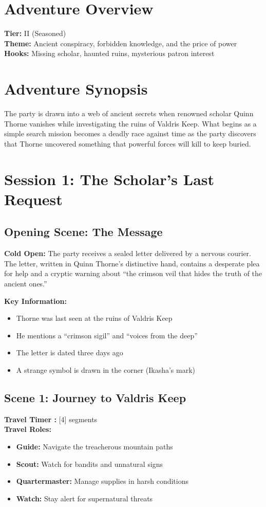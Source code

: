 \documentclass[11pt]{article}
\begin{document}
\section*{Adventure Overview}
\textbf{Tier:} II (Seasoned)\\
\textbf{Theme:} Ancient conspiracy, forbidden knowledge, and the price of power\\
\textbf{Hooks:} Missing scholar, haunted ruins, mysterious patron interest

\section*{Adventure Synopsis}
The party is drawn into a web of ancient secrets when renowned scholar Quinn Thorne vanishes while investigating the ruins of Valdris Keep. What begins as a simple search mission becomes a deadly race against time as the party discovers that Thorne uncovered something that powerful forces will kill to keep buried.

\section*{Session 1: The Scholar's Last Request}

\subsection*{Opening Scene: The Message}
\textbf{Cold Open:} The party receives a sealed letter delivered by a nervous courier. The letter, written in Quinn Thorne's distinctive hand, contains a desperate plea for help and a cryptic warning about ``the crimson veil that hides the truth of the ancient ones.''

\textbf{Key Information:}
\begin{itemize}[leftmargin=*]
\item Thorne was last seen at the ruins of Valdris Keep
\item He mentions a ``crimson sigil'' and ``voices from the deep''
\item The letter is dated three days ago
\item A strange symbol is drawn in the corner (Ikasha's mark)
\end{itemize}

\subsection*{Scene 1: Journey to Valdris Keep}
\textbf{Travel Timer :} [4] segments\\
\textbf{Travel Roles:}
\begin{itemize}[leftmargin=*]
\item \textbf{Guide:} Navigate the treacherous mountain paths
\item \textbf{Scout:} Watch for bandits and unnatural signs
\item \textbf{Quartermaster:} Manage supplies in harsh conditions
\item \textbf{Watch:} Stay alert for supernatural threats
\end{itemize}
\end{document}
